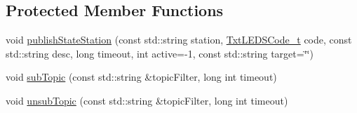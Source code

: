\subsection*{Protected Member Functions}
\begin{DoxyCompactItemize}
\item 
void \hyperlink{classft_1_1_txt_mqtt_factory_client_ad3915dae96da31b0b5abd1446cc899cf}{publish\+State\+Station} (const std\+::string station, \hyperlink{namespaceft_a14147563037506fac6464a9f6bcbad40}{Txt\+L\+E\+D\+S\+Code\+\_\+t} code, const std\+::string desc, long timeout, int active=-\/1, const std\+::string target=\char`\"{}\char`\"{})
\item 
void \hyperlink{classft_1_1_txt_mqtt_factory_client_a10e4e06910bca4e44656d178d3b01080}{sub\+Topic} (const std\+::string \&topic\+Filter, long int timeout)
\item 
void \hyperlink{classft_1_1_txt_mqtt_factory_client_abfd1407dd236dee490108671bb370d8d}{unsub\+Topic} (const std\+::string \&topic\+Filter, long int timeout)
\end{DoxyCompactItemize}
